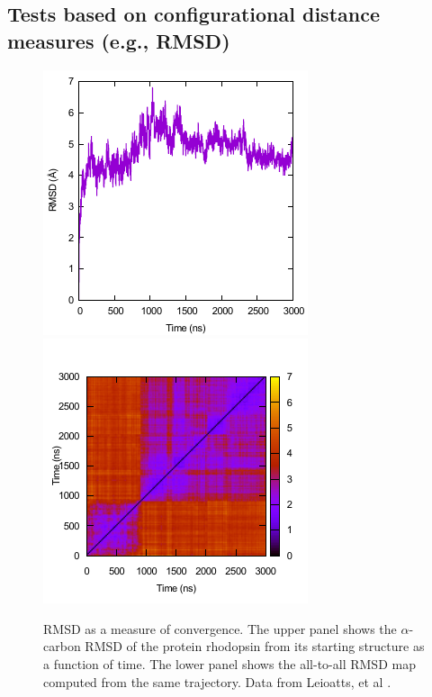 \subsection{Tests based on configurational distance measures (e.g., RMSD)}
\label{sec:bio_RMSD}

\begin{figure}
  \centering
  \includegraphics[width=0.9\linewidth]{figures/rmsd}
  \includegraphics[width=0.9\linewidth]{figures/rmsds}
  \caption{RMSD as a measure of convergence.  The upper panel shows the
    $\alpha$-carbon RMSD of the protein rhodopsin from its starting structure as a
    function of time.  The lower panel shows the all-to-all RMSD map computed from the same
    trajectory.  Data from Leioatts, et al \cite{Grossfield-2015}.}
  \label{f:rmsd}
\end{figure}
